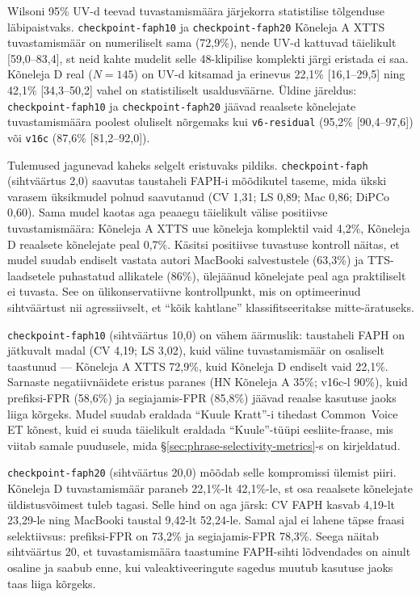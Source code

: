 Wilsoni 95\% UV-d teevad tuvastamismäära järjekorra statistilise tõlgenduse läbipaistvaks. \texttt{checkpoint-faph10} ja \texttt{checkpoint-faph20} Kõneleja A XTTS tuvastamismäär on numeriliselt sama (72,9\%), nende UV-d kattuvad täielikult [59,0--83,4], st neid kahte mudelit selle 48-klipilise komplekti järgi eristada ei saa. Kõneleja D real ($N=145$) on UV-d kitsamad ja erinevus 22,1\% [16,1--29,5] ning 42,1\% [34,3--50,2] vahel on statistiliselt usaldusväärne. Üldine järeldus: \texttt{checkpoint-faph10} ja \texttt{checkpoint-faph20} jäävad reaalsete kõnelejate tuvastamismäära poolest oluliselt nõrgemaks kui \texttt{v6-residual} (95,2\% [90,4--97,6]) või \texttt{v16c} (87,6\% [81,2--92,0]).

Tulemused jagunevad kaheks selgelt eristuvaks pildiks. \texttt{checkpoint-faph} (sihtväärtus 2,0) saavutas taustaheli FAPH-i mõõdikutel taseme, mida ükski varasem üksikmudel polnud saavutanud (CV 1,31; LS 0,89; Mac 0,86; DiPCo 0,60). Sama mudel kaotas aga peaaegu täielikult välise positiivse tuvastamismäära: Kõneleja A XTTS uue kõneleja komplektil vaid 4,2\%, Kõneleja D reaalsete kõnelejate peal 0,7\%. Käsitsi positiivse tuvastuse kontroll näitas, et mudel suudab endiselt vastata autori MacBooki salvestustele (63,3\%) ja TTS-laadsetele puhastatud allikatele (86\%), ülejäänud kõnelejate peal aga praktiliselt ei tuvasta. See on ülikonservatiivne kontrollpunkt, mis on optimeerinud sihtväärtust nii agressiivselt, et \enquote{kõik kahtlane} klassifitseeritakse mitte-äratuseks.

\texttt{checkpoint-faph10} (sihtväärtus 10,0) on vähem äärmuslik: taustaheli FAPH on jätkuvalt madal (CV 4,19; LS 3,02), kuid väline tuvastamismäär on osaliselt taastunud --- Kõneleja A XTTS 72,9\%, kuid Kõneleja D endiselt vaid 22,1\%. Sarnaste negatiivnäidete eristus paranes (HN Kõneleja A 35\%; v16c-l 90\%), kuid prefiksi-FPR (58,6\%) ja segiajamis-FPR (85,8\%) jäävad reaalse kasutuse jaoks liiga kõrgeks. Mudel suudab eraldada \enquote{Kuule Kratt}-i tihedast Common~Voice ET kõnest, kuid ei suuda täielikult eraldada \enquote{Kuule}-tüüpi eesliite-fraase, mis viitab samale puudusele, mida §\ref{sec:phrase-selectivity-metrics}-s on kirjeldatud.

\texttt{checkpoint-faph20} (sihtväärtus 20,0) mõõdab selle kompromissi ülemist piiri. Kõneleja D tuvastamismäär paraneb 22,1\%-lt 42,1\%-le, st osa reaalsete kõnelejate üldistusvõimest tuleb tagasi. Selle hind on aga järsk: CV FAPH kasvab 4,19-lt 23,29-le ning MacBooki taustal 9,42-lt 52,24-le. Samal ajal ei lahene täpse fraasi selektiivsus: prefiksi-FPR on 73,2\% ja segiajamis-FPR 78,3\%. Seega näitab sihtväärtus 20, et tuvastamismäära taastumine FAPH-sihti lõdvendades on ainult osaline ja saabub enne, kui valeaktiveeringute sagedus muutub kasutuse jaoks taas liiga kõrgeks.

